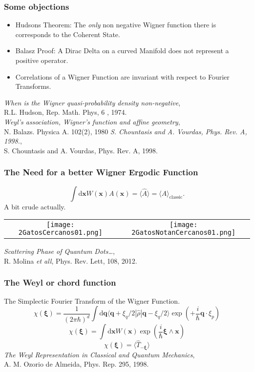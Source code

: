 \documentclass{beamer}
\newcommand{\ihb}{\frac{i}{\hbar}}
\newcommand{\xfase}{\mathbf{x}}
\newcommand{\qfase}{\mathbf{q}}
\newcommand{\xifase}{ {\boldsymbol{\xi}} }
\newcommand{\bra}[1]{\langle #1|}
\newcommand{\ket}[1]{|#1\rangle}
\newcommand{\rd}{\!\mathrm{d}}
\begin{document}
\begin{frame}
  \frametitle{Some objections}
  \begin{itemize}
  \item Hudsons Theorem: The \emph{only} non negative Wigner function
    there is  corresponds to the Coherent State.
  \item Balasz Proof: A Dirac Delta on a curved Manifold does not represent
    a positive operator.
  \item Correlations of a Wigner Function are invariant with respect to
    Fourier Transforms.
  \end{itemize}
  \emph{When is the Wigner quasi-probability density non-negative},\\
  R.L. Hudson, Rep. Math. Phys, 6 , 1974.\\
  \emph{Weyl's association, Wigner's function and affine geometry},\\
  N. Balazs. Physica A. 102(2), 1980 
    \emph{ S. Chountasis and A. Vourdas, Phys. Rev. A, 1998.},\\
  S. Chountasis and A. Vourdas, Phys. Rev. A, 1998.
\end{frame}


\begin{frame}
  \frametitle{The Need for a better Wigner Ergodic Function}
  \begin{equation}
    \int \rd \xfase W(\xfase) A(\xfase)=\langle \hat{A} \rangle=
    \langle A \rangle_{\text{classic}}.
    \end{equation}
    A bit crude actually.
    \begin{tabular}{cc}
      \texttt{[image: 2GatosCercanos01.png]} &
      \texttt{[image: 2GatosNotanCercanos01.png]} 
    \end{tabular}
  \emph{Scattering Phase of Quantum Dots\ldots},\\
  R. Molina \emph{et all}, Phys. Rev. Lett, 108, 2012.
\end{frame}    


\begin{frame}
  \frametitle{The Weyl or chord function}
  The Simplectic Fourier Transform of the Wigner Function.
  \begin{equation}
    \chi(\xifase)=\frac{1}{(2\pi\hbar)^d}\int \rd \qfase \bra{\qfase 
      +\xi_q/2}\hat{\rho}\ket{\qfase-\xi_q/2}\exp(+ \ihb \qfase \cdot \xi_p) 
  \end{equation}
   \begin{equation}
    \chi(\xifase)=\int \rd \xfase W(\xfase) \exp(\ihb \xifase\wedge \xfase)
  \end{equation}
  \begin{equation}
    \chi(\xifase)= \langle \hat{T}_{-\xifase} \rangle
  \end{equation}
  \emph{The Weyl Representation in Classical and Quantum Mechanics},\\
  A. M. Ozorio de Almeida, Phys. Rep. 295, 1998.
\end{frame}    
\end{document}
